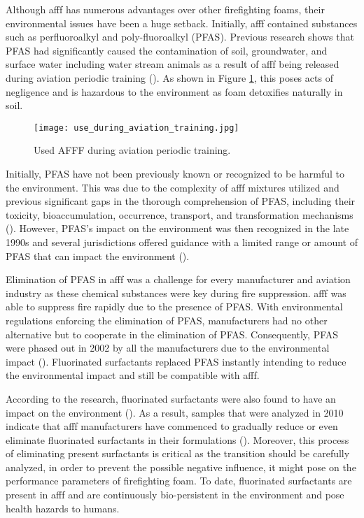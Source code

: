 Although \acrshort{afff} has numerous advantages over other firefighting foams, their environmental issues have been a huge setback. Initially, \acrshort{afff} contained substances such as perfluoroalkyl and poly-fluoroalkyl (PFAS). Previous research shows that PFAS had significantly caused the contamination of soil, groundwater, and surface water including water stream animals as a result of \acrshort{afff} being released during aviation periodic training (\cite{milley2018estimating}). As shown in Figure \ref{ch2:figure:use}, this poses acts of negligence and is hazardous to the environment as foam detoxifies naturally in soil.

\begin{figure}[H]
    \centering
    \texttt{[image: use\_during\_aviation\_training.jpg]}
    \caption{Used AFFF during aviation periodic training.}
    \label{ch2:figure:use}
\end{figure}

Initially, PFAS have not been previously known or recognized to be harmful to the environment. This was due to the complexity of \acrshort{afff} mixtures utilized and previous significant gaps in the thorough comprehension of PFAS, including their toxicity, bioaccumulation, occurrence, transport, and transformation mechanisms (\cite{milley2018estimating}). However, PFAS's impact on the environment was then recognized in the late 1990s and several jurisdictions offered guidance with a limited range or amount of PFAS that can impact the environment (\cite{hinnant2017influence}). 

Elimination of PFAS in \acrshort{afff} was a challenge for every manufacturer and aviation industry as these chemical substances were key during fire suppression. \acrshort{afff} was able to suppress fire rapidly due to the presence of PFAS. With environmental regulations enforcing the elimination of PFAS, manufacturers had no other alternative but to cooperate in the elimination of PFAS. Consequently, PFAS were phased out in 2002 by all the manufacturers due to the environmental impact (\cite{persson2003foamspex}).  Fluorinated surfactants replaced PFAS instantly intending to reduce the environmental impact and still be compatible with \acrshort{afff}.  

According to the research, fluorinated surfactants were also found to have an impact on the environment (\cite{martin2012fire}). As a result, samples that were analyzed in 2010 indicate that \acrshort{afff} manufacturers have commenced to gradually reduce or even eliminate fluorinated surfactants in their formulations (\cite{milley2018estimating}). Moreover, this process of eliminating present surfactants is critical as the transition should be carefully analyzed, in order to prevent the possible negative influence, it might pose on the performance parameters of firefighting foam. To date, fluorinated surfactants are present in \acrshort{afff} and are continuously bio-persistent in the environment and pose health hazards to humans. 

